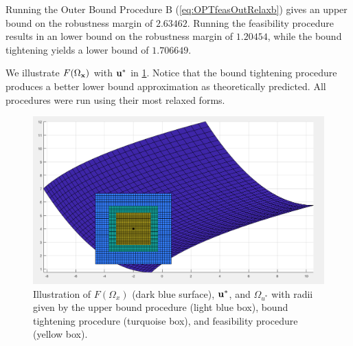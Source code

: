 Running the Outer Bound Procedure B (\cref{eq:OPTfeasOutRelaxb}) gives an upper bound on the robustness margin of $2.63462$.
Running the feasibility procedure results in an lower bound on the robustness margin of $1.20454$, while the bound tightening yields a lower bound of $1.706649$. 

We illustrate $F(\Omega_{\mathbf{x}})$ with $\mathbf{u}^*$ in \cref{fig:FOmega}.
Notice that the bound tightening procedure produces a better lower bound approximation as theoretically predicted.
All procedures were run using their most relaxed forms.


\begin{figure}[htp!]
  \begin{center}
    \includegraphics[scale=0.45]{Figures/newex} %
  \end{center}
  \caption{\label{fig:FOmega}
    Illustration of $F(\Omega_x)$ (dark blue surface), $\mathbf{u}^*$, and $\Omega_{u^*}$ with radii given by the upper bound procedure (light blue box), bound tightening procedure (turquoise box), and feasibility procedure (yellow box).
  }
\end{figure}


